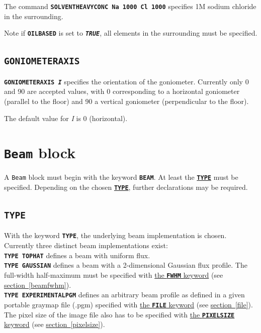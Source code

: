 \documentclass[a4paper]{article}
\newcommand{\Class}[1]{\texttt{#1}\xspace}
\newcommand{\Keyword}[1]{\texttt{\textbf{#1}}\xspace}
\newcommand{\SB}{\\[0.2em]}
\begin{document}
The command \Keyword{SOLVENTHEAVYCONC Na 1000 Cl 1000} specifies 1M sodium chloride in the surrounding.

Note if \Keyword{OILBASED} is set to \Keyword{\textit{TRUE}}, all elements in the surrounding must be specified.

\subsection{\Keyword{GONIOMETERAXIS}}
\label{goniometeraxis}

\noindent \Keyword{GONIOMETERAXIS \textit{I}}
specifies the orientation of the goniometer. Currently only 0 and 90 are accepted values, with 0 corresponding to a horizontal
goniometer (parallel to the floor) and 90 a vertical goniometer (perpendicular to the floor).

The default value for \textit{I} is 0 (horizontal).


\label{RDv3End}


\section{\Class{Beam} block}

A \Class{Beam} block must begin with the keyword \Keyword{BEAM}.
At least the \hyperref[beamtype]{\Keyword{TYPE}} must be specified.
Depending on the chosen \hyperref[beamtype]{\Keyword{TYPE}}, further declarations may be required.


\subsection{\Keyword{TYPE}}
\label{beamtype}

With the keyword \Keyword{TYPE}, the underlying beam implementation is chosen.
Currently three distinct beam implementations exist:\SB

\noindent \Keyword{TYPE TOPHAT} defines a beam with uniform flux.\SB

\noindent \Keyword{TYPE GAUSSIAN} defines a beam with a 2-dimensional Gaussian flux profile. The full-width half-maximum must be specified with \hyperref[beamfwhm]{the \Keyword{FWHM} keyword} (see \hyperref[beamfwhm]{section~\ref*{beamfwhm}}).\SB

\noindent \Keyword{TYPE EXPERIMENTALPGM} defines an arbitrary beam profile as defined in a given portable graymap file (.pgm) specified with \hyperref[file]{the \Keyword{FILE} keyword} (see \hyperref[file]{section~\ref*{file}}). The pixel size of the image file also has to be specified with \hyperref[pixelsize]{the \Keyword{PIXELSIZE} keyword} (see \hyperref[pixelsize]{section~\ref*{pixelsize}}).\SB
\end{document}
